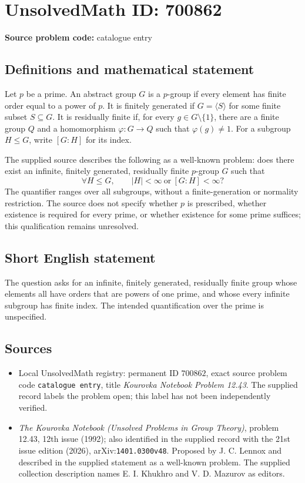 \documentclass[11pt]{article}
\begin{document}
\section*{UnsolvedMath ID: 700862}
\textbf{Source problem code:} catalogue entry
\subsection{Definitions and mathematical statement}
Let \(p\) be a prime. An abstract group \(G\) is a \(p\)-group if every element has finite order equal to a power of \(p\). It is finitely generated if \(G=\langle S\rangle\) for some finite subset \(S\subseteq G\). It is residually finite if, for every \(g\in G\setminus\{1\}\), there are a finite group \(Q\) and a homomorphism \(\varphi:G\to Q\) such that \(\varphi(g)\ne 1\). For a subgroup \(H\le G\), write \([G:H]\) for its index.

The supplied source describes the following as a well-known problem: does there exist an infinite, finitely generated, residually finite \(p\)-group \(G\) such that
\[
\forall H\le G,\qquad |H|<\infty\ \text{or}\ [G:H]<\infty?
\]
The quantifier ranges over all subgroups, without a finite-generation or normality restriction. The source does not specify whether \(p\) is prescribed, whether existence is required for every prime, or whether existence for some prime suffices; this qualification remains unresolved.
\subsection{Short English statement}
The question asks for an infinite, finitely generated, residually finite group whose elements all have orders that are powers of one prime, and whose every infinite subgroup has finite index. The intended quantification over the prime is unspecified.
\subsection{Sources}
\begin{itemize}
\item Local UnsolvedMath registry: permanent ID \(700862\), exact source problem code \texttt{catalogue entry}, title \emph{Kourovka Notebook Problem 12.43}. The supplied record labels the problem open; this label has not been independently verified.
\item \emph{The Kourovka Notebook (Unsolved Problems in Group Theory)}, problem 12.43, 12th issue (1992); also identified in the supplied record with the 21st issue edition (2026), arXiv:\texttt{1401.0300v48}. Proposed by J. C. Lennox and described in the supplied statement as a well-known problem. The supplied collection description names E. I. Khukhro and V. D. Mazurov as editors.
\end{itemize}
\end{document}
